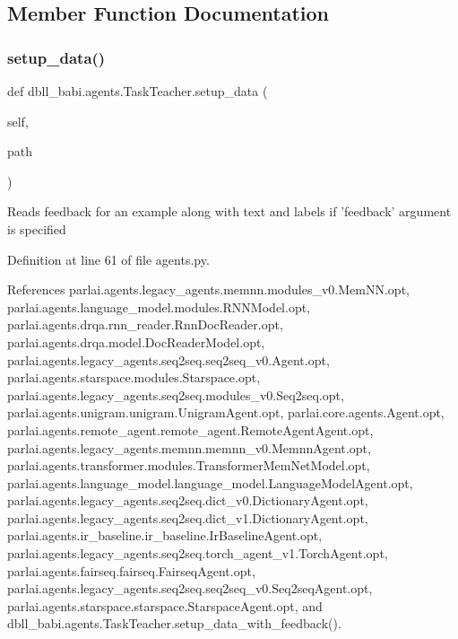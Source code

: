 \subsection{Member Function Documentation}
\mbox{\label{classdbll__babi_1_1agents_1_1TaskTeacher_adcbc1c54716e7b631e4a496f59df1f33}} 
\subsubsection{\texorpdfstring{setup\+\_\+data()}{setup\_data()}}
{\footnotesize\ttfamily def dbll\+\_\+babi.\+agents.\+Task\+Teacher.\+setup\+\_\+data (\begin{DoxyParamCaption}\item[{}]{self,  }\item[{}]{path }\end{DoxyParamCaption})}

\begin{DoxyVerb}Reads feedback for an example along with text and labels
if 'feedback' argument is specified
\end{DoxyVerb}
 

Definition at line 61 of file agents.\+py.



References parlai.\+agents.\+legacy\+\_\+agents.\+memnn.\+modules\+\_\+v0.\+Mem\+N\+N.\+opt, parlai.\+agents.\+language\+\_\+model.\+modules.\+R\+N\+N\+Model.\+opt, parlai.\+agents.\+drqa.\+rnn\+\_\+reader.\+Rnn\+Doc\+Reader.\+opt, parlai.\+agents.\+drqa.\+model.\+Doc\+Reader\+Model.\+opt, parlai.\+agents.\+legacy\+\_\+agents.\+seq2seq.\+seq2seq\+\_\+v0.\+Agent.\+opt, parlai.\+agents.\+starspace.\+modules.\+Starspace.\+opt, parlai.\+agents.\+legacy\+\_\+agents.\+seq2seq.\+modules\+\_\+v0.\+Seq2seq.\+opt, parlai.\+agents.\+unigram.\+unigram.\+Unigram\+Agent.\+opt, parlai.\+core.\+agents.\+Agent.\+opt, parlai.\+agents.\+remote\+\_\+agent.\+remote\+\_\+agent.\+Remote\+Agent\+Agent.\+opt, parlai.\+agents.\+legacy\+\_\+agents.\+memnn.\+memnn\+\_\+v0.\+Memnn\+Agent.\+opt, parlai.\+agents.\+transformer.\+modules.\+Transformer\+Mem\+Net\+Model.\+opt, parlai.\+agents.\+language\+\_\+model.\+language\+\_\+model.\+Language\+Model\+Agent.\+opt, parlai.\+agents.\+legacy\+\_\+agents.\+seq2seq.\+dict\+\_\+v0.\+Dictionary\+Agent.\+opt, parlai.\+agents.\+legacy\+\_\+agents.\+seq2seq.\+dict\+\_\+v1.\+Dictionary\+Agent.\+opt, parlai.\+agents.\+ir\+\_\+baseline.\+ir\+\_\+baseline.\+Ir\+Baseline\+Agent.\+opt, parlai.\+agents.\+legacy\+\_\+agents.\+seq2seq.\+torch\+\_\+agent\+\_\+v1.\+Torch\+Agent.\+opt, parlai.\+agents.\+fairseq.\+fairseq.\+Fairseq\+Agent.\+opt, parlai.\+agents.\+legacy\+\_\+agents.\+seq2seq.\+seq2seq\+\_\+v0.\+Seq2seq\+Agent.\+opt, parlai.\+agents.\+starspace.\+starspace.\+Starspace\+Agent.\+opt, and dbll\+\_\+babi.\+agents.\+Task\+Teacher.\+setup\+\_\+data\+\_\+with\+\_\+feedback().

